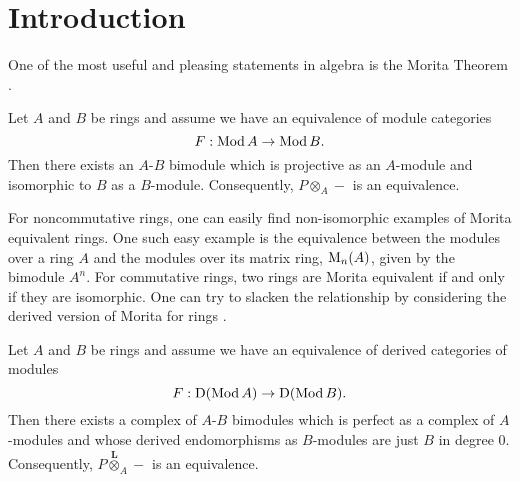 \documentclass[dissertation.tex]{subfiles}
\begin{document}


\section{Introduction} \label{section: Introduction}

One of the most useful and pleasing statements in algebra is the Morita Theorem \cite{Morita}.

\begin{theorem}
  Let \(A\) and \(B\) be rings and assume we have an equivalence of module categories 
  \begin{displaymath}
    F : \operatorname{Mod}A \to \operatorname{Mod}B.
  \end{displaymath}
  Then there exists an \(A\)-\(B\) bimodule which is projective as an \(A\)-module and isomorphic to \(B\) as a \(B\)-module. Consequently, \(P \otimes_A -\) is an equivalence. 
\end{theorem}

For noncommutative rings, one can easily find non-isomorphic examples of Morita equivalent rings.
One such easy example is the equivalence between the modules over a ring \(A\) and the modules over its matrix ring, \(\operatorname{M}_n(A)\), given by the bimodule \(A^n\).
For commutative rings, two rings are Morita equivalent if and only if they are isomorphic. One can try to slacken the relationship by considering the derived version of Morita for rings \cite{Rickard}.

\begin{theorem}
  Let \(A\) and \(B\) be rings and assume we have an equivalence of derived categories of modules
  \begin{displaymath}
    F : \mathrm{D}(\operatorname{Mod}A) \to \mathrm{D}(\operatorname{Mod}B).
  \end{displaymath}
  Then there exists a complex of \(A\)-\(B\) bimodules which is perfect as a complex of \(A\)-modules and whose derived endomorphisms as \(B\)-modules are just \(B\) in degree \(0\). Consequently, \(P \overset{\mathbf{L}}{\otimes}_A -\) is an equivalence. 
\end{theorem}
\end{document}
